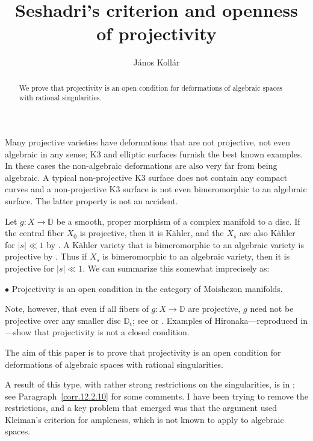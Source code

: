 \documentclass{amsart}
\theoremstyle{definition}
\theoremstyle{remark}
\newcommand{\dd}[0]{{\mathbb D}}
\begin{document}


  \title{Seshadri's criterion and openness of projectivity}
  \author{J\'anos Koll\'ar}

\begin{abstract} 
We prove that   projectivity is an open condition for deformations of algebraic spaces with rational singularities.
\end{abstract}

 \maketitle




 
Many projective varieties have deformations that are not projective, not even algebraic in any sense; K3 and elliptic surfaces furnish the best known examples.
In these cases the non-algebraic deformations are also very far from being algebraic.   
A typical non-projective K3 surface does not contain any compact curves and
a non-projective K3 surface  is not  even bimeromorphic to an algebraic surface. The latter property is not an accident.

Let $g: X\to \dd$ be a smooth, proper morphism of a complex manifold to a disc.
If the central fiber $X_0$ is  projective, then it is K\"ahler, and the $X_s$ are also  K\"ahler for $|s|\ll 1$ 
by \cite{MR0112154}. A K\"ahler variety that is bimeromorphic to an algebraic variety is projective by \cite{Moi-66}. Thus if  $X_s$ is bimeromorphic to an algebraic variety, then it  is  projective for $|s|\ll 1$. We can summarize this somewhat imprecisely as:

\medskip

$\bullet$ 
Projectivity is an open condition in the category of Moishezon manifolds.
\medskip

Note, however, that even if all fibers of $g: X\to \dd$ are projective,
$g$ need not be projective over any smaller disc $\dd_\epsilon$; see
\cite{Atiyah58} or \cite[Exmp.4]{k-defgt}.
Examples of Hironaka---reproduced in \cite[App.B]{hartsh}---show that
projectivity is not a closed condition.



The aim of this paper is to prove that   projectivity is an open condition for deformations of algebraic spaces with rational singularities.

A result of this type, with rather strong restrictions on the singularities, is in  \cite[12.2.10]{km-flips}; see Paragraph~\ref{corr.12.2.10} for some comments.
I have been trying to remove the restrictions, and a key problem that emerged was that the argument  used Kleiman's criterion for ampleness, which is not known to apply to algebraic spaces.
\end{document}
